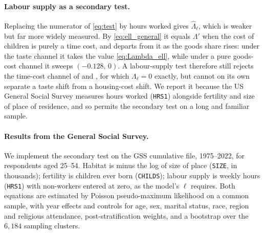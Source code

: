\documentclass[11pt]{article}
\begin{document}
\paragraph{Labour supply as a secondary test.}
Replacing the numerator of \eqref{eq:test} by hours worked gives $\widehat\Lambda_\ell$, which is
weaker but far more widely measured. By \eqref{eq:ell_general} it equals $\Lambda'$ when the cost of
children is purely a time cost, and departs from it as the goods share rises: under the taste
channel it takes the value \eqref{eq:Lambda_ell}, while under a pure goods-cost channel it sweeps
$(-0.128,\,0)$. A labour-supply test therefore still rejects the time-cost channel of
\citet{DELACROIX2012271} and \citet{dao25}, for which $\Lambda_\ell=0$ exactly, but cannot on its
own separate a taste shift from a housing-cost shift. We report it because the US General Social
Survey measures hours worked (\texttt{HRS1}) alongside fertility and size of place of residence,
and so permits the secondary test on a long and familiar sample.

\paragraph{Results from the General Social Survey.}
We implement the secondary test on the GSS cumulative file, 1975--2022, for respondents aged
25--54. Habitat is minus the log of size of place (\texttt{SIZE}, in thousands); fertility is
children ever born (\texttt{CHILDS}); labour supply is weekly hours (\texttt{HRS1}) with
non-workers entered at zero, as the model's $\ell$ requires. Both equations are estimated by
Poisson pseudo-maximum likelihood on a common sample, with year effects and controls for age, sex,
marital status, race, region and religious attendance, post-stratification weights, and a
bootstrap over the $6{,}184$ sampling clusters.
\end{document}
